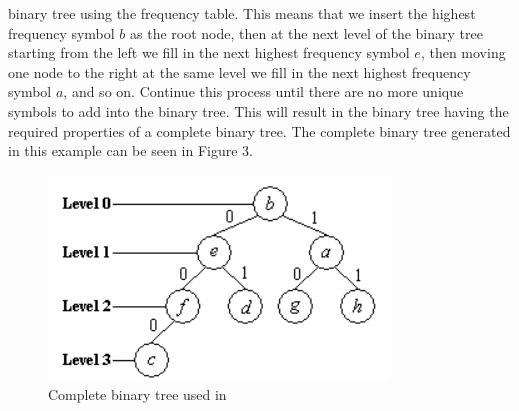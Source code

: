 \documentclass[12pt]{IEEEtran}
\begin{document}
binary tree using the frequency table. This means that we insert the highest frequency symbol $b$ as the root node, then at the
next level of the binary tree starting from the left we fill in the next highest frequency symbol $e$, then moving one node to
the right at the same level we fill in the next highest frequency symbol $a$, and so on. Continue this process until there are no
more unique symbols to add into the binary tree. This will result in the binary tree having the required properties of a complete binary tree.
The complete binary tree generated in this example can be seen in Figure 3.
\begin{figure}
\centering
\includegraphics[scale=0.6]{../presentation/images/completebinarytree.PNG}
\caption{Complete binary tree used in \cite{Sjostrand}}
\end{figure}
\end{document}
